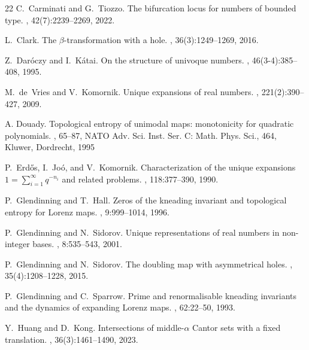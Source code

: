 \documentclass[11pt]{amsart}
\theoremstyle{definition}
\theoremstyle{remark}
\numberwithin{equation}{section}
\begin{document}
\begin{thebibliography}{22}
C.~Carminati and G.~Tiozzo.
\newblock The bifurcation locus for numbers of bounded type.
, 42(7):2239--2269, 2022.

L.~Clark.
\newblock The {$\beta$}-transformation with a hole.
, 36(3):1249--1269, 2016.

Z.~Dar{\'o}czy and I.~K{\'a}tai.
\newblock On the structure of univoque numbers.
, 46(3-4):385--408, 1995.

M.~de~Vries and V.~Komornik.
\newblock Unique expansions of real numbers.
, 221(2):390--427, 2009.

A. Douady.
\newblock Topological entropy of unimodal maps: monotonicity for quadratic polynomials.
, 65--87,
\newblock NATO Adv. Sci. Inst. Ser. C: Math. Phys. Sci., 464, Kluwer, Dordrecht, 1995

P.~Erd\H{o}s, I.~Jo\'{o}, and V.~Komornik.
\newblock Characterization of the unique expansions $1=\sum_{i=1}^\infty
  q^{-n_i}$ and related problems.
, 118:377--390, 1990.

P.~Glendinning and T.~Hall.
\newblock Zeros of the kneading invariant and topological entropy for Lorenz maps.
, 9:999--1014, 1996.

P.~Glendinning and N.~Sidorov.
\newblock Unique representations of real numbers in non-integer bases.
, 8:535--543, 2001.

P.~Glendinning and N.~Sidorov.
\newblock The doubling map with asymmetrical holes.
, 35(4):1208--1228, 2015.

P.~Glendinning and C.~Sparrow.
\newblock Prime and renormalisable kneading invariants and the dynamics of expanding Lorenz maps.
, 62:22--50, 1993.

{
Y.~Huang and D.~Kong.
\newblock Intersections of middle-$\alpha$ Cantor sets with a fixed translation.
, 36(3):1461--1490, 2023.}


\end{thebibliography}
\end{document}

